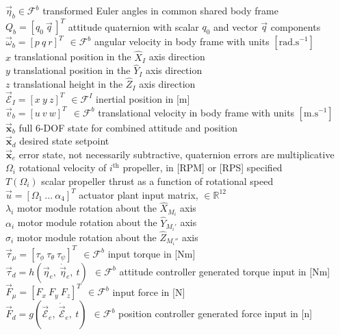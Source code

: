 \documentclass[a4paper, 11pt, oneside, openright, parskip=full]{book}
\begin{document}
$\vec{\eta}_b \in\mathcal{F}^b$ transformed Euler angles in common shared body frame\\
$Q_b=[q_0~\vec{q}\hspace{2pt}]^T$ attitude quaternion with scalar $q_0$ and vector $\vec{q}$ components\\
$\vec{\omega}_b=[p~q~r]^T~~\in\mathcal{F}^b$ angular velocity in body frame with units $[\text{rad.s}^{-1}]$\\
$x$ translational position in the $\hat{X}_I$ axis direction\\
$y$ translational position in the $\hat{Y}_I$ axis direction\\
$z$ translational height in the $\hat{Z}_I$ axis direction\\
$\vec{\mathcal{E}}_I=[x~y~z]^T~~\in\mathcal{F}^{I}$ inertial position in [m]\\
$\vec{v}_b=[u~v~w]^T~~\in\mathcal{F}^b$ translational velocity in body frame with units $[\text{m.s}^{-1}]$\\
$\vec{\mathbf{x}}_b$ full 6-DOF state for combined attitude and position\\
$\vec{\mathbf{x}}_d$ desired state setpoint\\
$\vec{\mathbf{x}}_e$ error state, not necessarily subtractive, quaternion errors are multiplicative\\
$\Omega_i$ rotational velocity of $i^{\text{th}}$ propeller, in [RPM] or [RPS] specified\\
$T(\Omega_i)$ scalar propeller thrust as a function of rotational speed\\
$\vec{u}=[\Omega_1~...~\alpha_4]^T$ actuator plant input matrix, $\in\mathbb{R}^{12}$\\
$\lambda_i$ motor module rotation about the $\hat{X}_{M_i}$ axis\\
$\alpha_i$ motor module rotation about the $\hat{Y}_{M_i'}$ axis\\
$\sigma_i$ motor module rotation about the $\hat{Z}_{M_i''}$ axis\\
$\vec{\tau}_\mu = [\tau_\phi~\tau_\theta~\tau_\psi]^T~~\in\mathcal{F}^b$ input torque in [Nm]\\
$\vec{\tau}_d = h(\vec{\eta}_e,~\dot{\vec{\eta}}_e,~t)~~\in\mathcal{F}^b$ attitude controller generated torque input in [Nm]\\
$\vec{F}_\mu=[F_x~F_y~F_z]^T~~\in\mathcal{F}^b$ input force in [N]\\
$\vec{F}_d=g(\vec{\mathcal{E}}_e,~\dot{\vec{\mathcal{E}}}_e,~t)~~\in\mathcal{F}^b$ position controller generated force input in [n]\\
\end{document}
